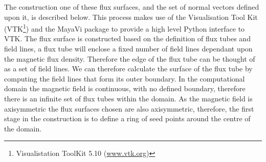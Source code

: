 The construction one of these flux surfaces, and the set of normal vectors defined upon it, is described below.
This process makes use of the Visualisation Tool Kit (VTK\footnote{Visualistation ToolKit 5.10 (\url{www.vtk.org})}) and the MayaVi package \cite{Ramachandran2001} to provide a high level Python interface to VTK.
The flux surface is constructed based on the definition of flux tubes and field lines, a flux tube will enclose a fixed number of field lines dependant upon the magnetic flux density.
Therefore the edge of the flux tube can be thought of as a set of field lines.
We can therefore calculate the surface of the flux tube by computing the field lines that form its outer boundary.
In the computational domain the magnetic field is continuous, with no defined boundary, therefore there is an infinite set of flux tubes within the domain.
As the magnetic field is axisymmetric the flux surfaces chosen are also axisymmetric, therefore, the first stage in the construction is to define a ring of seed points around the centre of the domain.
